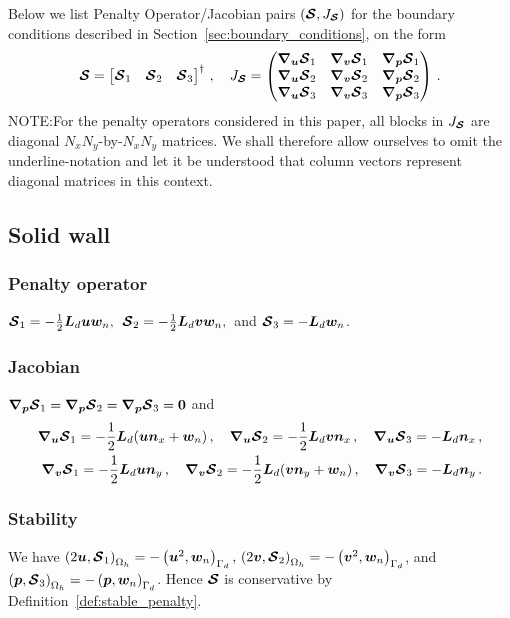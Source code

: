 Below we list Penalty Operator/Jacobian pairs $(\bm{\mathcal{S}},J_{\bm{\mathcal{S}}})$ for the boundary conditions described in Section~\ref{sec:boundary_conditions}, on the form
  \begin{equation*}
    \bm{\mathcal{S}} =
    \begin{bmatrix}
      \bm{\mathcal{S}}_1 & \bm{\mathcal{S}}_2 & \bm{\mathcal{S}}_3
    \end{bmatrix}^\dagger \,, \quad
    J_{\bm{\mathcal{S}}} =
    \begin{pmatrix}
      \bm{\nabla}_{\bm{u}} \bm{\mathcal{S}}_1 & \bm{\nabla}_{\bm{v}} \bm{\mathcal{S}}_1 & \bm{\nabla}_{\bm{p}} \bm{\mathcal{S}}_1 \\
      \bm{\nabla}_{\bm{u}} \bm{\mathcal{S}}_2 & \bm{\nabla}_{\bm{v}} \bm{\mathcal{S}}_2 & \bm{\nabla}_{\bm{p}} \bm{\mathcal{S}}_2 \\
      \bm{\nabla}_{\bm{u}} \bm{\mathcal{S}}_3 & \bm{\nabla}_{\bm{v}} \bm{\mathcal{S}}_3 & \bm{\nabla}_{\bm{p}} \bm{\mathcal{S}}_3
    \end{pmatrix} \,.
  \end{equation*}
NOTE:\@ For the penalty operators considered in this paper, all blocks in $J_{\bm{\mathcal{S}}}$ are diagonal $N_x N_y$-by-$N_x N_y$ matrices. We shall therefore allow ourselves to omit the underline-notation and let it be understood that column vectors represent diagonal matrices in this context.

\subsection{Solid wall}%
\label{sub:solid_wall_discrete}
\subsubsection*{Penalty operator}
$\bm{\mathcal{S}}_1 = -\frac{1}{2} \bm{L}_d \bm{u} \bm{w}_n,\,$
$\bm{\mathcal{S}}_2 = -\frac{1}{2} \bm{L}_d \bm{v} \bm{w}_n,\,$
and
$\bm{\mathcal{S}}_3 = -\bm{L}_d \bm{w}_n$.

\subsubsection*{Jacobian}
$
  \bm{\nabla}_{\bm{p}} \bm{\mathcal{S}}_1 =
  \bm{\nabla}_{\bm{p}} \bm{\mathcal{S}}_2 =
  \bm{\nabla}_{\bm{p}} \bm{\mathcal{S}}_3 = \bm{0}
$
and
\begin{align*}
  \bm{\nabla}_{\bm{u}} \bm{\mathcal{S}}_1 = -\frac{1}{2} \bm{L}_d (\bm{u}\bm{n}_x + \bm{w}_n) \,, \quad
  \bm{\nabla}_{\bm{u}} \bm{\mathcal{S}}_2 = -\frac{1}{2} \bm{L}_d \bm{v}\bm{n}_x \,, \quad
  \bm{\nabla}_{\bm{u}} \bm{\mathcal{S}}_3 = -\bm{L}_d \bm{n}_x \,, \\
  \bm{\nabla}_{\bm{v}} \bm{\mathcal{S}}_1 = -\frac{1}{2} \bm{L}_d \bm{u} \bm{n}_y \,, \quad
  \bm{\nabla}_{\bm{v}} \bm{\mathcal{S}}_2 = -\frac{1}{2} \bm{L}_d (\bm{v}\bm{n}_y + \bm{w}_n) \,, \quad
  \bm{\nabla}_{\bm{v}} \bm{\mathcal{S}}_3 = -\bm{L}_d \bm{n}_y \,.
\end{align*}
\subsubsection*{Stability}
We have $\left(2\bm{u}, \bm{\mathcal{S}}_1\right)_{\Omega_h} = -\left(\bm{u}^2, \bm{w}_n\right)_{\Gamma_d}, \, \left(2\bm{v}, \bm{\mathcal{S}}_2\right)_{\Omega_h} = -\left(\bm{v}^2, \bm{w}_n\right)_{\Gamma_d}$, and $\left(\bm{p}, \bm{\mathcal{S}}_3\right)_{\Omega_h} = -\left(\bm{p}, \bm{w}_n\right)_{\Gamma_d}$. Hence $\bm{\mathcal{S}}$ is conservative by Definition~\ref{def:stable_penalty}.
